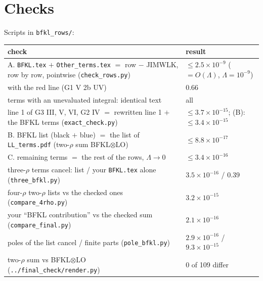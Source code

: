 \documentclass[10pt]{article}
\numberwithin{equation}{section}
\begin{document}
\section{Checks}\label{sec:checks}
Scripts in \texttt{bfkl\_rows/}:
\begin{center}\small
\begin{tabular}{@{}p{}p{}@{}}\toprule
check & result\\\midrule
A. \texttt{BFKL.tex} $+$ \texttt{Other\_terms.tex} $=$ row $-$ JIMWLK, row by row, pointwise (\texttt{check\_rows.py}) & $\le 2.5\times10^{-9}$ ($=O(\Lambda)$, $\Lambda=10^{-9}$)\\
\quad with the red line (G1 V 2b UV) & $0.66$\\
\quad terms with an unevaluated integral: identical text & all\\
line 1 of G3 III, V, VI, G2 IV $=$ rewritten line 1 $+$ the BFKL terms (\texttt{exact\_check.py}) & $\le3.7\times10^{-15}$; (B): $\le3.4\times10^{-15}$\\
B. BFKL list (black $+$ blue) $=$ the list of \texttt{LL\_terms.pdf} (two-$\rho$ sum BFKL$\otimes$LO) & $\le 8.8\times10^{-17}$\\
C. remaining terms $=$ the rest of the rows, $\Lambda\to0$ & $\le 3.4\times10^{-16}$\\
three-$\rho$ terms cancel: list / your \texttt{BFKL.tex} alone (\texttt{three\_bfkl.py}) & $3.5\times10^{-16}$ / $0.39$\\
four-$\rho$ two-$\rho$ lists vs the checked ones (\texttt{compare\_4rho.py}) & $3.2\times10^{-15}$\\
your ``BFKL contribution'' vs the checked sum (\texttt{compare\_final.py}) & $2.1\times10^{-16}$\\
poles of the list cancel / finite parts (\texttt{pole\_bfkl.py}) & $2.9\times10^{-16}$ / $9.3\times10^{-15}$\\
two-$\rho$ sum vs BFKL$\otimes$LO (\texttt{../final\_check/render.py}) & 0 of 109 differ\\\bottomrule
\end{tabular}
\end{center}
\end{document}
